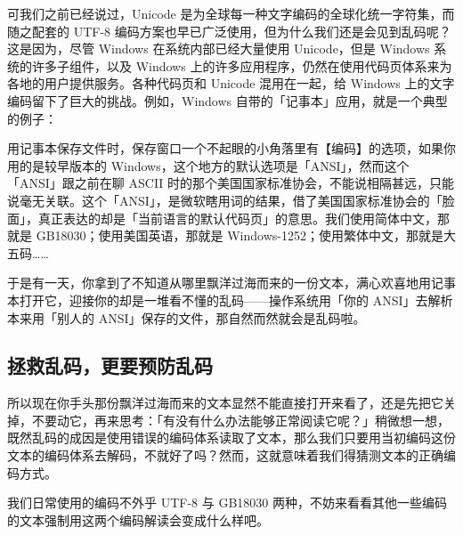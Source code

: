 可我们之前已经说过，Unicode 是为全球每一种文字编码的全球化统一字符集，而随之配套的 UTF-8 编码方案也早已广泛使用，但为什么我们还是会见到乱码呢？这是因为，尽管 Windows 在系统内部已经大量使用 Unicode，但是 Windows 系统的许多子组件，以及 Windows 上的许多应用程序，仍然在使用代码页体系来为各地的用户提供服务。各种代码页和 Unicode 混用在一起，给 Windows 上的文字编码留下了巨大的挑战。例如，Windows 自带的「记事本」应用，就是一个典型的例子：

用记事本保存文件时，保存窗口一个不起眼的小角落里有【编码】的选项，如果你用的是较早版本的 Windows，这个地方的默认选项是「ANSI」，然而这个「ANSI」跟之前在聊 ASCII 时的那个美国国家标准协会，不能说相隔甚远，只能说毫无关联。这个「ANSI」，是微软瞎用词的结果，借了美国国家标准协会的「脸面」，真正表达的却是「当前语言的默认代码页」的意思。我们使用简体中文，那就是 GB18030；使用美国英语，那就是 Windows-1252；使用繁体中文，那就是大五码……

于是有一天，你拿到了不知道从哪里飘洋过海而来的一份文本，满心欢喜地用记事本打开它，迎接你的却是一堆看不懂的乱码——操作系统用「你的 ANSI」去解析本来用「别人的 ANSI」保存的文件，那自然而然就会是乱码啦。

\subsection{拯救乱码，更要预防乱码}

所以现在你手头那份飘洋过海而来的文本显然不能直接打开来看了，还是先把它关掉，不要动它，再来思考：「有没有什么办法能够正常阅读它呢？」稍微想一想，既然乱码的成因是使用错误的编码体系读取了文本，那么我们只要用当初编码这份文本的编码体系去解码，不就好了吗？然而，这就意味着我们得猜测文本的正确编码方式。

我们日常使用的编码不外乎 UTF-8 与 GB18030 两种，不妨来看看其他一些编码的文本强制用这两个编码解读会变成什么样吧。


